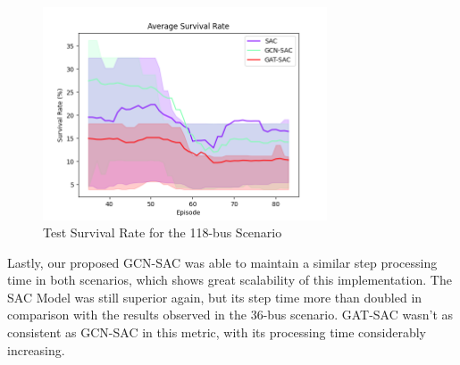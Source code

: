 \begin{figure}[ht]
	\includegraphics[width=0.75\textwidth]{graphs/118/survival_rate_val.png}
	\caption{Test Survival Rate for the 118-bus Scenario}
	\label{fig:118-sr-val}
\end{figure}

Lastly, our proposed GCN-SAC was able to maintain a similar step processing time in both scenarios, which shows great scalability of this implementation. The \ac{SAC} Model was still superior again, but its step time more than doubled in comparison with the results observed in the 36-bus scenario. GAT-SAC wasn't as consistent as GCN-SAC in this metric, with its processing time considerably increasing.

